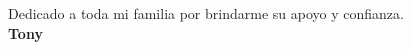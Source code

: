 \pagestyle{empty}

\null

\vfill
{\it

\begin{flushright}
Dedicado a toda mi familia por brindarme su apoyo y confianza.\\
\vspace{1cm}
\textbf{Tony}
\end{flushright}

}

\thispagestyle{empty}